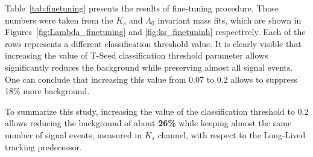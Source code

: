 Table~\ref{tab:finetuning} presents the results of fine-tuning procedure. Those numbers were taken from the $K_s$ and $\Lambda_0$ invariant mass fits, which are shown in Figures~\ref{fig:Lambda_finetuning} and \ref{fig:ks_finetuninh} respectively. Each of the rows represents a different classification threshold value. It is clearly visible that increasing the value of T-Seed classification threshold parameter allows significantly reduces the background while preserving almost all signal events. One can conclude that increasing this value from 0.07 to 0.2 allows to suppress 18\% more background.  

To summarize this study, increasing the value of the classification threshold to 0.2 allows reducing the background of about \textbf{ 26\%} while keeping almost the same number of signal events, measured in $K_s$ channel, with respect to the Long-Lived tracking predecessor. 

